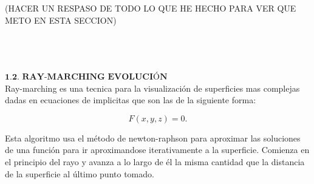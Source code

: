 (HACER UN RESPASO DE TODO LO QUE HE HECHO PARA VER QUE METO EN ESTA SECCION)


${ }$\\
${ }$\\
${ }$\\
$\textbf{1.2. RAY-MARCHING EVOLUCIÓN}$
${ }$\\

Ray-marching es una tecnica para la visualización de superficies mas complejas dadas en ecuaciones de implicitas que son las de la siguiente forma:

\[
F(x,y,z) = 0.
\]

Esta algoritmo usa el método de newton-raphson para aproximar las soluciones de una función para ir aproximandose iterativamente a la superficie. Comienza en el principio del rayo y avanza a lo largo de él la misma cantidad que la distancia de la superficie al último punto tomado.